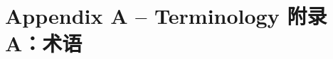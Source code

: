\chapter{\ifdefined\eng
Appendix A -- Terminology
\fi
\ifdefined\chs
附录A：术语
\fi
}

\theendnotes
\setcounter{endnote}{0}
